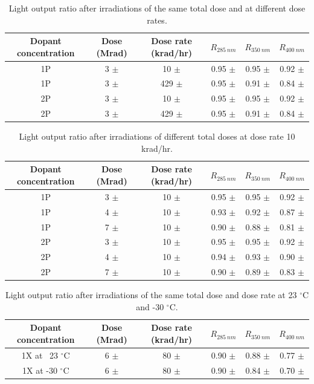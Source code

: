 \documentclass[preprint,12pt]{elsarticle}
\begin{document}
\begin{table}[!ht]
\centering
  \caption{Light output ratio after irradiations of the same total dose and at different dose rates.}
  \begin{tabular}{c|c|c|c|c|c}
    \hline
    Dopant concentration & Dose (Mrad) 	& Dose rate (krad/hr)    &$R_{285~nm}$	&$R_{350~nm}$	&$R_{400~nm}$	\\ \hline
    1P     	    	 & 3 $\pm$  	& 10 $\pm$  	   	 &0.95 $\pm$	&0.95 ${\pm}$	&0.92 ${\pm}$	\\ 
    1P			 & 3 $\pm$	& 429 $\pm$		 &0.95 ${\pm}$	&0.91 ${\pm}$	&0.84 ${\pm}$	\\ \hline 
    2P     	    	 & 3 $\pm$  	& 10 $\pm$  	   	 &0.95 ${\pm}$	&0.95 ${\pm}$	&0.92 ${\pm}$	\\ 
    2P			 & 3 $\pm$	& 429 $\pm$		 &0.95 ${\pm}$	&0.91 ${\pm}$	&0.84 ${\pm}$	\\ \hline
  \end{tabular}
  \label{table:1}
\end{table}

\begin{table}[!ht]
\centering
  \caption{Light output ratio after irradiations of different total doses at dose rate 10 krad/hr.}
  \begin{tabular}{c|c|c|c|c|c}
    \hline
    Dopant concentration & Dose (Mrad) 	& Dose rate (krad/hr)    &$R_{285~nm}$	&$R_{350~nm}$	&$R_{400~nm}$	\\ \hline
    1P     	    	 & 3 $\pm$  	& 10 $\pm$  	   	 &0.95 $\pm$	&0.95 ${\pm}$	&0.92 ${\pm}$	\\ 
    1P     	    	 & 4 $\pm$  	& 10 $\pm$  	   	 &0.93 ${\pm}$	&0.92 ${\pm}$	&0.87 ${\pm}$	\\ 
    1P			 & 7 $\pm$	& 10 $\pm$		 &0.90 ${\pm}$	&0.88 ${\pm}$	&0.81 ${\pm}$	\\ \hline
    2P     	    	 & 3 $\pm$  	& 10 $\pm$  	   	 &0.95 ${\pm}$	&0.95 ${\pm}$	&0.92 ${\pm}$	\\ 
    2P     	    	 & 4 $\pm$  	& 10 $\pm$  	   	 &0.94 ${\pm}$	&0.93 ${\pm}$	&0.90 ${\pm}$	\\ 
    2P			 & 7 $\pm$	& 10 $\pm$		 &0.90 ${\pm}$	&0.89 ${\pm}$	&0.83 ${\pm}$	\\ \hline
  \end{tabular}
  \label{table:2}
\end{table}

\begin{table}[!ht]
\centering
  \caption{Light output ratio after irradiations of the same total dose and dose rate at 23 $^\circ$C and -30 $^\circ$C.}
  \begin{tabular}{c|c|c|c|c|c}
    \hline
    Dopant concentration & Dose (Mrad) 	& Dose rate (krad/hr)    &$R_{285~nm}$	&$R_{350~nm}$	&$R_{400~nm}$	\\ \hline
    1X at ~23 $^\circ$C	 & 6 $\pm$	& 80 $\pm$		 &0.90 ${\pm}$	&0.88 ${\pm}$	&0.77 ${\pm}$	\\ 
    1X at -30 $^\circ$C	 & 6 $\pm$	& 80 $\pm$		 &0.90 ${\pm}$	&0.84 ${\pm}$	&0.70 ${\pm}$	\\ \hline
  \end{tabular}
  \label{table:3}
\end{table}
\end{document}
